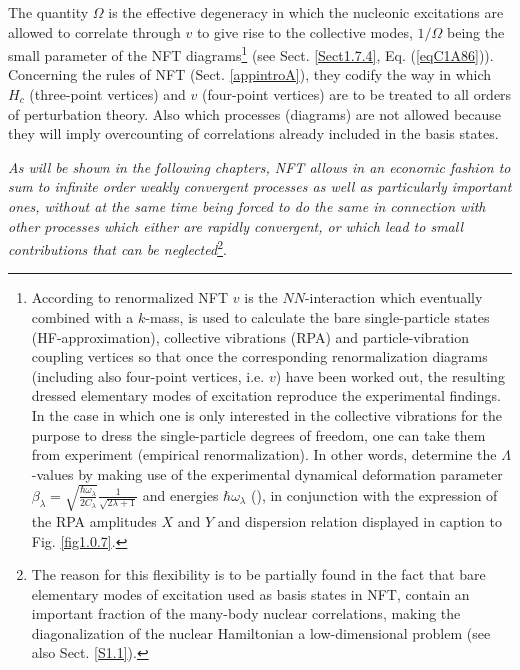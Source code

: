 The quantity $\Omega$ is the effective degeneracy in which the nucleonic excitations are allowed to correlate through $v$ to give rise to the collective modes, $1/\Omega$ being the small parameter of the NFT diagrams\footnote{According to renormalized NFT $v$ is the $NN$-interaction which eventually combined with a $k$-mass, is used to calculate the bare single-particle states (HF-approximation), collective vibrations (RPA) and particle-vibration coupling vertices so that once the corresponding renormalization  diagrams (including also four-point vertices, i.e. $v$) have been worked out, the resulting dressed elementary modes of excitation reproduce the experimental findings. In the case in which  one is only interested in the collective vibrations for the purpose to dress the single-particle degrees of freedom, one can take them from experiment (empirical renormalization). In other words, determine the $\Lambda$-values by making use of the experimental dynamical deformation parameter $\beta_\lambda=\sqrt{\frac{\hbar\omega_\lambda}{2C_\lambda}}\frac{1}{\sqrt{2\lambda+1}}$ and energies $\hbar\omega_\lambda$ (\cite{Broglia:16}), in conjunction with the expression of the RPA amplitudes $X$ and $Y$ and dispersion relation displayed in caption to Fig. \ref{fig1.0.7}.} (see Sect. \ref{Sect1.7.4}, Eq. (\ref{eqC1A86})). Concerning the rules of NFT (Sect. \ref{appintroA}), they codify the way in which $H_c$ (three-point vertices) and $v$ (four-point vertices) are to be treated to all orders of perturbation theory. Also which processes (diagrams) are not allowed because they will imply overcounting of correlations already included in the basis states. 

\textit{As will be shown in the following chapters, NFT allows in an economic fashion to sum to infinite order weakly convergent processes as well as particularly important ones, without at the same time being forced to do the same in connection with other processes which either are rapidly convergent, or which lead to small contributions that can be neglected}\footnote{The reason for this flexibility is to be partially found in the fact that bare elementary modes of excitation used as basis states in NFT, contain an important fraction of the many-body nuclear correlations, making the diagonalization of the nuclear Hamiltonian a low-dimensional problem (see also Sect. \ref{S1.1}).}.


